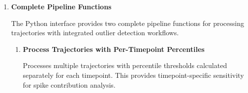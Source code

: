 \documentclass[11pt]{article}
\begin{document}
\begin{enumerate}
\begin{itemize}
	      	\item \textbf{Dimension Validation}: Input dimensions are validated before
	      	      calling Fortran routines
	      	      
	      	\item \textbf{Error Handling}: Fortran error codes are converted to Python
	      	      exceptions via \texttt{check\_err\_code()}
	      	      
	      	\item \textbf{Memory Efficiency}: Output arrays are marked as read-only to
	      	      prevent accidental modification
	      	      
	      	\item \textbf{Boolean Conversion}: C integer arrays (0/1) are automatically
	      	      converted to Python boolean arrays
	      \end{itemize}
	      
	      \textbf{Usage Notes:}
	      \begin{itemize}
	      	\item Use \textbf{expert} versions when you have pre-computed
	      	      permutations for better performance
	      	      
	      	\item Use \textbf{convenience} versions for simpler workflows where
	      	      internal allocation is acceptable
	      	      
	      	\item All input arrays should be in \textbf{Fortran order} (column-major)
	      	      for optimal performance
	      	      
	      	\item Output arrays are \textbf{read-only} to maintain data integrity
	      \end{itemize}
	      
	\item \textbf{Complete Pipeline Functions}
	      
	      The Python interface provides two complete pipeline functions for processing
	      trajectories with integrated outlier detection workflows.
	      
	      \begin{enumerate}
	      	\item \textbf{Process Trajectories with Per-Timepoint Percentiles}
	      	      
	      	      Processes multiple trajectories with percentile thresholds calculated separately
	      	      for each timepoint. This provides timepoint-specific sensitivity for
	      	      spike contribution analysis.
	      	      

\end{enumerate}
\end{enumerate}
\end{document}

